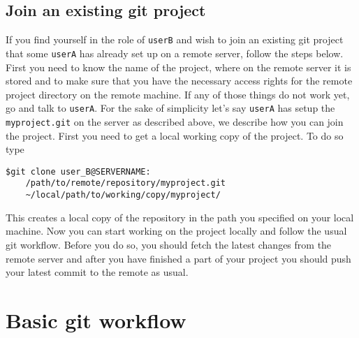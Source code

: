 \documentclass{article}
\begin{document}
\subsection{Join an existing git project}
If you find yourself in the role of \verb|userB| and wish to join an existing git project that some \verb|userA| has already set up on a remote server, follow the steps below.
First you need to know the name of the project, where on the remote server it is stored and to make sure that you have the necessary access rights for the remote project directory on the remote machine.
If any of those things do not work yet, go and talk to \verb|userA|.
For the sake of simplicity let's say \verb|userA| has setup the \verb|myproject.git| on the server as described above, we describe how you can join the project.
\noindent
First you need to get a local working copy of the project. To do so type
\begin{lstlisting}
$git clone user_B@SERVERNAME:
	/path/to/remote/repository/myproject.git
	~/local/path/to/working/copy/myproject/
\end{lstlisting}
This creates a local copy of the repository in the path you specified on your local machine.
Now you can start working on the project locally and follow the usual git workflow.
Before you do so, you should fetch the latest changes from the remote server and after you have finished a
part of your project you should push your latest commit to the remote as usual.


\section{Basic git workflow}
\end{document}
